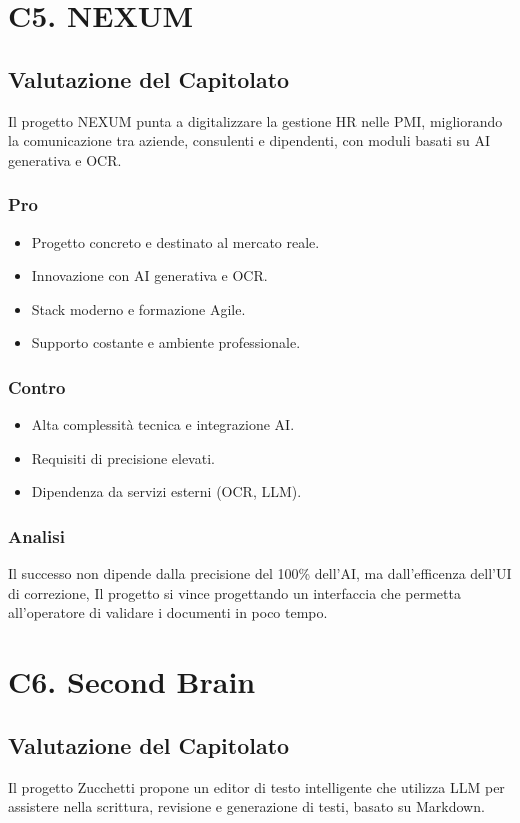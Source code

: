 \documentclass[a4paper, 11pt, oneside]{scrartcl} %
\begin{document}
\section{C5. NEXUM}
\subsection*{Valutazione del Capitolato}
Il progetto NEXUM punta a digitalizzare la gestione HR nelle PMI, migliorando la comunicazione tra aziende, consulenti e dipendenti, con moduli basati su AI generativa e OCR.

\subsubsection*{Pro}
\begin{itemize}
    \item Progetto concreto e destinato al mercato reale.
    \item Innovazione con AI generativa e OCR.
    \item Stack moderno e formazione Agile.
    \item Supporto costante e ambiente professionale.
\end{itemize}

\subsubsection*{Contro}
\begin{itemize}
    \item Alta complessità tecnica e integrazione AI.
    \item Requisiti di precisione elevati.
    \item Dipendenza da servizi esterni (OCR, LLM).
\end{itemize}
\subsubsection*{Analisi}
Il successo non dipende dalla precisione del 100\% dell'AI, ma dall'efficenza dell'UI di correzione, Il progetto si vince progettando un interfaccia che permetta all'operatore di validare i documenti in poco tempo.

\section{C6. Second Brain}
\subsection*{Valutazione del Capitolato}
Il progetto Zucchetti propone un editor di testo intelligente che utilizza LLM per assistere nella scrittura, revisione e generazione di testi, basato su Markdown.
\end{document}

